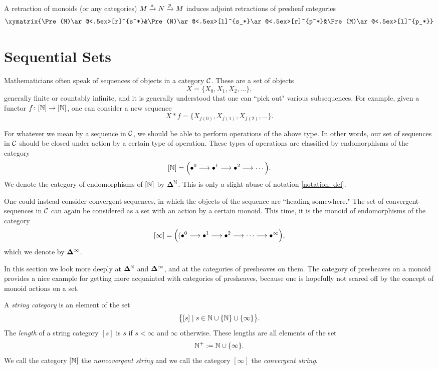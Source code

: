 \documentclass{amsart}
\def\Del{{\bf \Delta}}
\def\Deln{\Del^\NN}
\def\Delinf{{\Del^\infty}}
\def\NNN{\NN^+}
\begin{document}
A retraction of monoids (or any categories) $M\xrightarrow{s}N\xrightarrow{p}M$ induces adjoint retractions of presheaf categories $$\xymatrix{\Pre(M)\ar@<.5ex>[r]^{s^*}&\Pre(N)\ar@<.5ex>[l]^{s_*}\ar@<.5ex>[r]^{p^*}&\Pre(M)\ar@<.5ex>[l]^{p_*}}$$

\section{Sequential Sets}

Mathematicians often speak of sequences of objects in a category $\mathcal{C}$.  These are a set of objects $$X=\{X_0,X_1,X_2,\ldots\},$$ generally finite or countably infinite, and it is generally understood that one can ``pick out" various subsequences.  For example, given a functor $f\colon[{\mathbb N}]\rightarrow[{\mathbb N}]$, one can consider a new sequence $$X*f=\{X_{f(0)},X_{f(1)},X_{f(2)},\ldots\}.$$

For whatever we mean by a sequence in $\mathcal{C}$, we should be able to perform operations of the above type.  In other words, our set of sequences in $\mathcal{C}$ should be closed under action by a certain type of operation.  These types of operations are classified by endomorphisms of the category $$[{\mathbb N}]=\Big(\bullet^0\longrightarrow\bullet^1\longrightarrow\bullet^2\longrightarrow\cdots\Big).$$  We denote the category of endomorphisms of $[{\mathbb N}]$ by $\Deln$.  This is only a slight abuse of notation \ref{notation: del}.

One could instead consider convergent sequences, in which the objects of the sequence are ``heading somewhere."  The set of convergent sequences in $\mathcal{C}$ can again be considered as a set with an action by a certain monoid.  This time, it is the monoid of endomorphisms of the category $$[\infty]=\Big((\bullet^0\longrightarrow\bullet^1\longrightarrow\bullet^2\longrightarrow\cdots\longrightarrow\bullet^\infty\Big),$$ which we denote by $\Delinf$.

In this section we look more deeply at $\Deln$ and $\Delinf$, and at the categories of presheaves on them.  The category of presheaves on a monoid provides a nice example for getting more acquainted with categories of presheaves, because one is hopefully not scared off by the concept of monoid actions on a set.  

\begin{definition}

A {\em string category} is an element of the set $$\big\{[s]\; |\; s\in{\mathbb N}\cup\{{\mathbb N}\}\cup\{\infty\}\big\}.$$  The {\em length} of a string category $[s]$ is $s$ if $s<\infty$ and $\infty$ otherwise.  These lengths are all elements of the set $$\NNN:=\NN\cup\{\infty\}.$$  We call the category $[{\mathbb N}]$ the {\em noncovergent string} and we call the category $[\infty]$ the {\em convergent string}.  


\end{definition}
\end{document}
